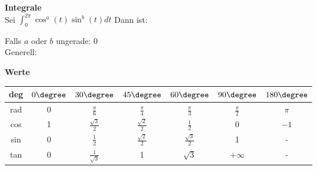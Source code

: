 \begin{flushleft}
\textbf{Integrale} \\
Sei $\int_{0}^{2\pi} \cos^{a}(t)\sin^{b}(t)dt$
Dann ist:

 \begin{table}[H] \centering {} \end{table}
Falls $a$ oder $b$ ungerade: $0$\\Generell: 	





\textbf{Werte}
\begin{center} 

 \begin{tabular}{c|cccccc}
  deg& $0 \degree $ & $30 \degree $ & $45 \degree $ & $60 \degree $ & $90 \degree $  & $180 \degree $\\
  \hline
  rad & 0 & $\frac{\pi}{6}$ & $\frac{\pi}{4}$ & $\frac{\pi}{3}$ & $\frac{\pi}{2}$ & $\pi$ \\
  cos & 1 & $\frac{\sqrt{3}}{2}$ & $\frac{\sqrt{2}}{2}$ & $\frac{1}{2}$ & 0  & $-1$\\
  sin & 0 & $\frac{1}{2}$ & $\frac{\sqrt{2}}{2}$ & $\frac{\sqrt{3}}{2}$ & 1 & - \\
  tan & 0 & $\frac{1}{\sqrt{3}}$ & 1 & $\sqrt{3}$ & $+\infty$ &-  \\
 \end{tabular}
\end{center} 
 
 
 

\end{flushleft}

